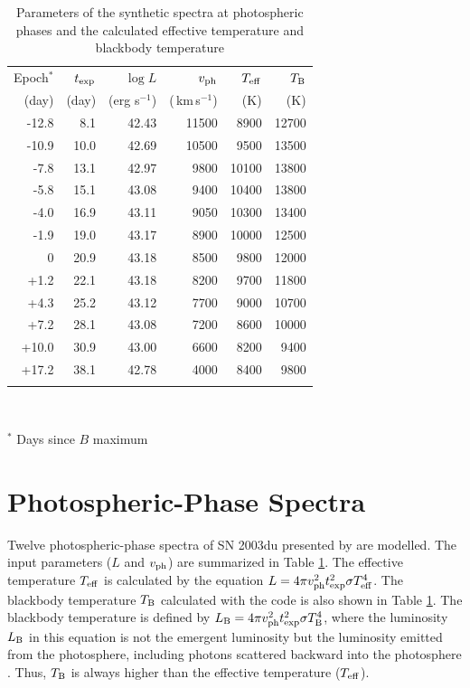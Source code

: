 \documentclass[usegraphicx,usenatbib]{mn2e}
\newcommand{\kms}{\mbox{\,km\,s$^{-1}$}}
\newcommand{\vph}{$v_{\rm ph}$}
\newcommand{\texp}{t_{\rm exp}}
\begin{document}
\begin{table}
\begin{center}
\caption{Parameters of the synthetic spectra at photospheric phases
and the calculated effective temperature and blackbody temperature}
\label{tab:param}
\begin{tabular}{rrrrrr}
\hline\hline
\noalign{\vspace{2pt}}
Epoch$^*$ & $\texp$  & $\log L$   & $v_{\rm ph}$ & $T_{\rm eff}$   &$T_{\rm B}$ \\
(day)   &  (day)  &  (erg s$^{-1}$)  &    (\kms)  & (K)    & (K)   \\
\hline
-12.8   &  8.1  & 42.43  &  11500& 8900 & 12700  \\
-10.9   & 10.0  & 42.69  &  10500& 9500 & 13500  \\
-7.8    & 13.1  & 42.97  &   9800& 10100 & 13800  \\
-5.8    & 15.1  & 43.08  &   9400& 10400 & 13800  \\ [2.5pt]

-4.0    & 16.9  & 43.11  &   9050& 10300 & 13400  \\
-1.9    & 19.0  & 43.17  &   8900& 10000 & 12500  \\
 0      & 20.9  & 43.18  &   8500& 9800  & 12000  \\
+1.2    & 22.1  & 43.18  &   8200& 9700  & 11800  \\ [2.5pt]

+4.3    & 25.2  & 43.12  &   7700& 9000 & 10700  \\
+7.2    & 28.1  & 43.08  &   7200& 8600 & 10000  \\
+10.0   & 30.9  & 43.00  &   6600& 8200 &  9400  \\
+17.2   & 38.1  & 42.78  &   4000& 8400 &  9800  \\
\noalign{\vspace{2pt}}
\hline
\end{tabular}\\
\end{center}
$^*$ Days since $B$ maximum
\end{table}


\section{Photospheric-Phase Spectra}
\label{sec:early}

Twelve photospheric-phase spectra of SN 2003du presented by \citet{stanishev07}
are modelled. The input parameters ($L$ and \vph) are summarized in Table
\ref{tab:param}. The effective temperature $T_{\rm eff}$ is calculated 
by the equation $L = 4 \pi v_{\rm ph}^2 \texp^2 \sigma T_{\rm eff}^4$.
The blackbody temperature $T_{\rm B}$ calculated with the code is
also shown in Table \ref{tab:param}.
The blackbody temperature is defined by 
$L_{\rm B} = 4 \pi  v_{\rm ph}^2 \texp^2 \sigma T_{\rm B}^4$, 
where the luminosity $L_{\rm B}$ in this equation 
is not the emergent luminosity but the luminosity 
emitted from the photosphere, including photons scattered backward into
the photosphere \citep{mazzalilucy93}.
Thus, $T_{\rm B}$ is always higher than 
the effective temperature ($T_{\rm eff}$).
\end{document}

